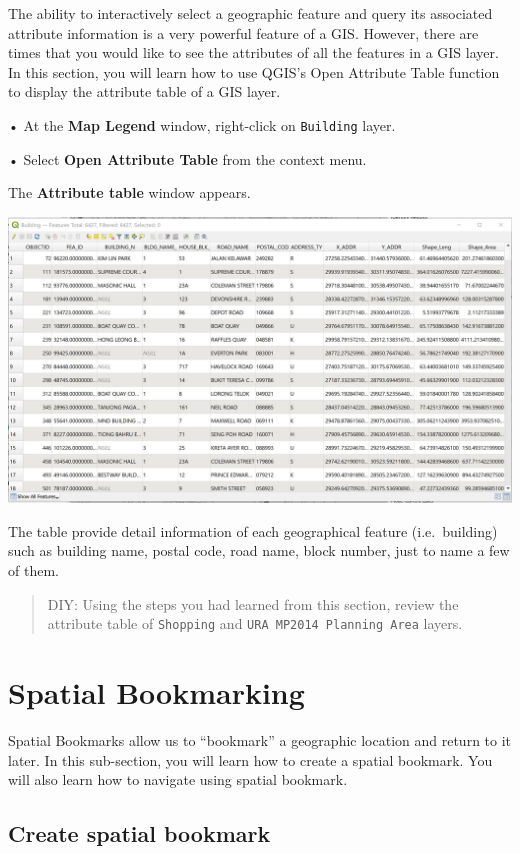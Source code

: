 \documentclass[
  letterpaper,
  DIV=11,
  numbers=noendperiod]{scrreprt}
\begin{document}
The ability to interactively select a geographic feature and query its
associated attribute information is a very powerful feature of a GIS.
However, there are times that you would like to see the attributes of
all the features in a GIS layer. In this section, you will learn how to
use QGIS's Open Attribute Table function to display the attribute table
of a GIS layer.

• At the \textbf{Map Legend} window, right-click on \texttt{Building}
layer.

• Select \textbf{Open Attribute Table} from the context menu.

The \textbf{Attribute table} window appears.

\includegraphics{./img/image1-22.jpg}

The table provide detail information of each geographical feature
(i.e.~building) such as building name, postal code, road name, block
number, just to name a few of them.

\begin{quote}
DIY: Using the steps you had learned from this section, review the
attribute table of \texttt{Shopping} and
\texttt{URA\ MP2014\ Planning\ Area} layers.
\end{quote}

\hypertarget{spatial-bookmarking}{%
\section{Spatial Bookmarking}\label{spatial-bookmarking}}

Spatial Bookmarks allow us to ``bookmark'' a geographic location and
return to it later. In this sub-section, you will learn how to create a
spatial bookmark. You will also learn how to navigate using spatial
bookmark.

\hypertarget{create-spatial-bookmark}{%
\subsection{Create spatial bookmark}\label{create-spatial-bookmark}}
\end{document}
